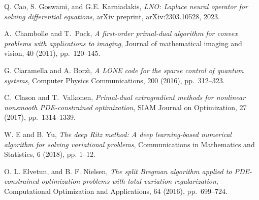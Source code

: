 \documentclass[final]{siamart171218}
\theoremstyle{remark}
\begin{document}
\begin{thebibliography}{10}

Q. Cao, S. Goswami, and G.E. Karniadakis,  {\em LNO: Laplace neural operator for solving differential equations}, arXiv preprint, arXiv:2303.10528, 2023.
	
	{ A.~Chambolle and T.~Pock}, {\em A first-order primal-dual algorithm for
		convex problems with applications to imaging}, Journal of mathematical
	imaging and vision, 40 (2011), pp.~120--145.
	
	
	{ G. Ciaramella and A. Borz{\`\i}},  {\em A LONE code for the sparse control of quantum systems}, Computer Physics Communications, 200 (2016), pp.~312--323.
	

	
	{ C.~Clason and T.~Valkonen}, {\em Primal-dual extragradient methods for
		nonlinear nonsmooth PDE-constrained optimization}, SIAM Journal on
	Optimization, 27 (2017), pp.~1314--1339.
	
	W. E and B. Yu, {\em The deep Ritz method: A deep learning-based numerical algorithm for solving
	variational problems}, Communications in Mathematics and Statistics, 6 (2018), pp. 1--12.
	
	O. L. Elvetun, and B. F. Nielsen,  {\em The split Bregman algorithm applied to PDE-constrained optimization problems with total variation regularization}, Computational Optimization and Applications, 64 (2016), pp.~699--724.
%	
	

\end{thebibliography}
\end{document}
